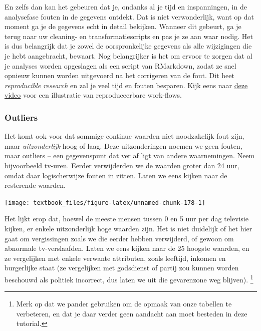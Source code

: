 \documentclass[]{tufte-book}
\newenvironment{Shaded}{}{}
\newcommand{\DataTypeTok}[1]{\textcolor[rgb]{0.56,0.13,0.00}{#1}}
\newcommand{\DecValTok}[1]{\textcolor[rgb]{0.25,0.63,0.44}{#1}}
\newcommand{\KeywordTok}[1]{\textcolor[rgb]{0.00,0.44,0.13}{\textbf{#1}}}
\newcommand{\NormalTok}[1]{#1}
\newcommand{\OperatorTok}[1]{\textcolor[rgb]{0.40,0.40,0.40}{#1}}
\newcommand{\StringTok}[1]{\textcolor[rgb]{0.25,0.44,0.63}{#1}}
\begin{document}
En zelfs dan kan het gebeuren dat je, ondanks al je tijd en inspanningen, in de analysefase fouten in de gegevens ontdekt. Dat is niet verwonderlijk, want op dat moment ga je de gegevens echt in detail bekijken. Wanneer dit gebeurt, ga je terug naar uw cleaning- en transformatiescripts en pas je ze aan waar nodig. Het is dus belangrijk dat je zowel de oorspronkelijke gegevens als alle wijzigingen die je hebt aangebracht, bewaart. Nog belangrijker is het om ervoor te zorgen dat al je analyses worden opgeslagen als een script van RMarkdown, zodat ze snel opnieuw kunnen worden uitgevoerd na het corrigeren van de fout. Dit heet \emph{reproducible research} en zal je veel tijd en fouten besparen. Kijk eens naar \href{https://www.youtube.com/watch?v=s3JldKoA0zw}{deze video} voor een illustratie van reproduceerbare work-flows.

\hypertarget{outliers}{%
\subsubsection{Outliers}\label{outliers}}

Het komt ook voor dat sommige continue waarden niet noodzakelijk fout zijn, maar \emph{uitzonderlijk} hoog of laag. Deze uitzonderingen noemen we geen fouten, maar outliers -- een gegevenspunt dat ver af ligt van andere waarnemingen. Neem bijvoorbeeld tv-uren. Eerder verwijderden we de waarden groter dan 24 uur, omdat daar logischerwijze fouten in zitten. Laten we eens kijken naar de resterende waarden.

\begin{Shaded}
\end{Shaded}

\texttt{[image: textbook\_files/figure-latex/unnamed-chunk-178-1]}

Het lijkt erop dat, hoewel de meeste mensen tussen 0 en 5 uur per dag televisie kijken, er enkele uitzonderlijk hoge waarden zijn. Het is niet duidelijk of het hier gaat om vergissingen zoals we die eerder hebben verwijderd, of gewoon om abnormale tv-verslaafden. Laten we eens kijken naar de 25 hoogste waarden, en ze vergelijken met enkele verwante attributen, zoals leeftijd, inkomen en burgerlijke staat (ze vergelijken met godsdienst of partij zou kunnen worden beschouwd als politiek incorrect, dus laten we uit die gevarenzone weg blijven). \footnote{Merk op dat we pander gebruiken om de opmaak van onze tabellen te verbeteren, en dat je daar verder geen aandacht aan moet besteden in deze tutorial.}
\end{document}
